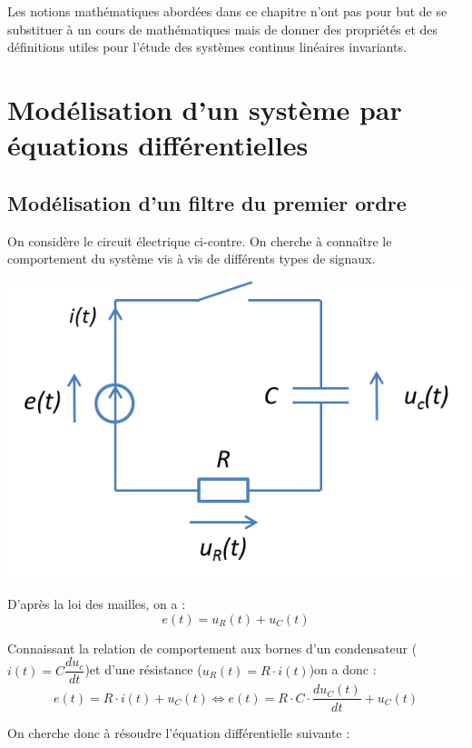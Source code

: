 \documentclass[11pt,oneside]{article}
\begin{document}
Les notions mathématiques abordées dans ce chapitre n'ont pas pour but de se substituer à un cours de mathématiques mais de donner des propriétés et des définitions utiles pour l'étude des systèmes continus linéaires invariants.

\section{Modélisation d'un système par équations différentielles}
\subsection{Modélisation d'un filtre du premier ordre}

\begin{minipage}[c]{.6\linewidth}
On considère le circuit électrique ci-contre. On cherche à connaître le comportement du système vis à vis de différents types de signaux.
\end{minipage}\hfill
\begin{minipage}[c]{.35\linewidth}
\begin{center}
\includegraphics[width=.9\textwidth]{png/RC}
\end{center}
\end{minipage}

D'après la loi des mailles, on a :
$$
e(t)=u_R(t) + u_C(t)
$$

Connaissant la relation de comportement aux bornes d'un condensateur ($i(t)=C\dfrac{du_c}{dt}$)et d'une résistance ($u_R(t)=R\cdot i(t)$)on a donc :
$$
e(t)=R\cdot i(t) +  u_C(t) 
\Longleftrightarrow e(t)=R\cdot C\cdot \dfrac{du_C(t)}{dt} +  u_C(t)
$$

On cherche donc à résoudre l'équation différentielle suivante : 
\end{document}
